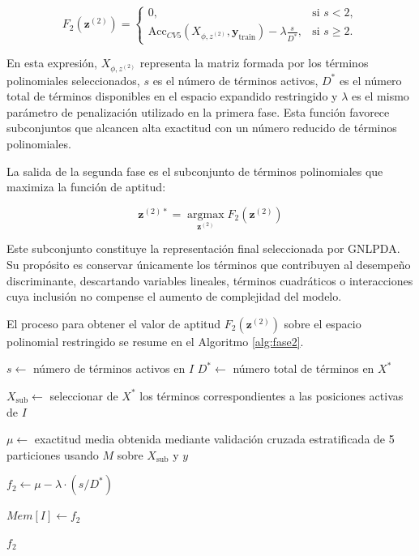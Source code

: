 \begin{equation}
	F_2(\mathbf{z}^{(2)}) = 
	\begin{cases} 
		0, & \text{si } s < 2, \\
		\text{Acc}_{CV5}(X_{\phi,z^{(2)}}, \mathbf{y}_{\text{train}}) - \lambda \frac{s}{D^*}, & \text{si } s \geq 2.
	\end{cases}
	\label{eq:EM12}
\end{equation}

En esta expresión, $X_{\phi,z^{(2)}}$ representa la matriz formada por los términos polinomiales seleccionados, $s$ es el número de términos activos, $D^*$ es el número total de términos disponibles en el espacio expandido restringido y $\lambda$ es el mismo parámetro de penalización utilizado en la primera fase. Esta función favorece subconjuntos que alcancen alta exactitud con un número reducido de términos polinomiales.

La salida de la segunda fase es el subconjunto de términos polinomiales que maximiza la función de aptitud:

\begin{equation}
	\mathbf{z}^{(2)*} = \operatorname*{argmax}_{\mathbf{z}^{(2)}} F_2(\mathbf{z}^{(2)})
	\label{eq:EM13}
\end{equation}

Este subconjunto constituye la representación final seleccionada por GNLPDA. Su propósito es conservar únicamente los términos que contribuyen al desempeño discriminante, descartando variables lineales, términos cuadráticos o interacciones cuya inclusión no compense el aumento de complejidad del modelo.

El proceso para obtener el valor de aptitud $F_2(\mathbf{z}^{(2)})$ sobre el espacio polinomial restringido se resume en el Algoritmo \ref{alg:fase2}.

\begin{algorithm}[H]
	
	$s \gets$ número de términos activos en $I$\;
	$D^{*} \gets$ número total de términos en $X^{*}$\;
	
	
	
	$X_{\text{sub}} \gets$ seleccionar de $X^{*}$ los términos correspondientes a las posiciones activas de $I$\;
	
	$\mu \gets$ exactitud media obtenida mediante validación cruzada estratificada de 5 particiones usando $M$ sobre $X_{\text{sub}}$ y $y$\;
	
	$f_2 \gets \mu - \lambda \cdot (s/D^{*})$\;
	
	$Mem[I] \gets f_2$\;
	
	\Return $f_2$\;	
	\caption{Evaluación de aptitud en espacio polinomial restringido}
	\label{alg:fase2}	
\end{algorithm}

